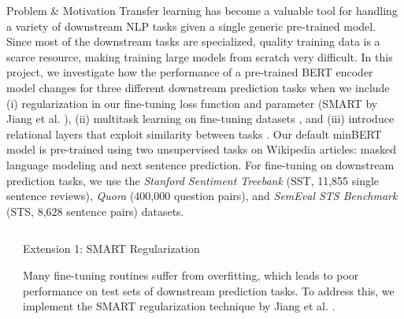 \documentclass[final]{beamer}
\newlength{\sepwidth}
\newlength{\colwidth}
\newcommand{\separatorcolumn}{\begin{column}{\sepwidth}\end{column}}
\begin{document}
\begin{frame}[t]
\vfill
\begin{block}{\large Problem \& Motivation}
  Transfer learning has become a valuable tool for handling a variety of downstream NLP tasks given a single generic pre-trained model. Since most of the downstream tasks are specialized, quality training data is a scarce resource, making training large models from scratch very difficult. 
  In this project, we investigate how the performance of a pre-trained BERT encoder model changes for three different downstream prediction tasks when we include (i) regularization in our fine-tuning loss function and parameter (SMART by Jiang et al. \cite{smart}), (ii) multitask learning on fine-tuning datasets \cite{MTL}, and (iii) introduce relational layers that exploit similarity between tasks \cite{MTL}. Our default minBERT model is pre-trained using two unsupervised tasks on Wikipedia articles: masked language modeling and next sentence prediction. For fine-tuning on downstream prediction tasks, we use the \textit{Stanford Sentiment Treebank} (SST, 11,855 single sentence reviews), \textit{Quora} (400,000 question pairs), and \textit{SemEval STS Benchmark} (STS, 8,628 sentence pairs) datasets. 

\end{block}

\begin{columns}[t]
\separatorcolumn

\begin{column}{\colwidth}

  \begin{block}{Extension 1: SMART Regularization}
            
Many fine-tuning routines suffer from overfitting, which leads to poor performance on test sets of downstream prediction tasks. To address this, we implement the SMART regularization technique by Jiang et al. \cite{smart}.


\end{block}
\end{column}
\end{columns}
\end{frame}
\end{document}
